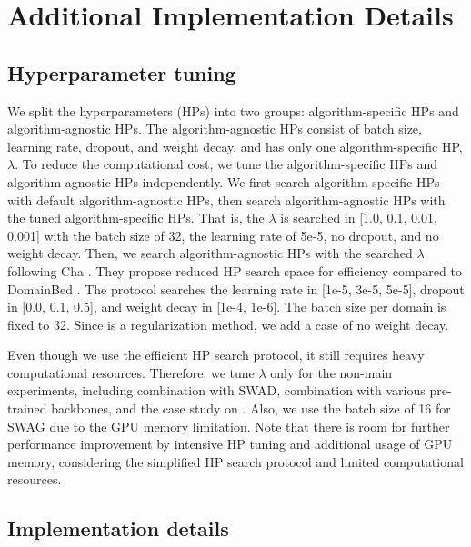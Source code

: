 \section{Additional Implementation Details}
\label{sec:additional_impl_details}

\subsection{Hyperparameter tuning}


We split the hyperparameters (HPs) into two groups: algorithm-specific HPs and algorithm-agnostic HPs. The algorithm-agnostic HPs consist of batch size, learning rate, dropout, and weight decay, and \method{} has only one algorithm-specific HP, $\lambda$.
To reduce the computational cost, we tune the algorithm-specific HPs and algorithm-agnostic HPs independently. 
We first search algorithm-specific HPs with default algorithm-agnostic HPs, then search algorithm-agnostic HPs with the tuned algorithm-specific HPs.
That is, the $\lambda$ is searched in [1.0, 0.1, 0.01, 0.001] with the batch size of 32, the learning rate of 5e-5, no dropout, and no weight decay. Then, we search algorithm-agnostic HPs with the searched $\lambda$ following Cha \etal \cite{cha2021swad}. They propose reduced HP search space for efficiency compared to DomainBed \cite{gulrajani2020domainbed}. The protocol searches the learning rate in [1e-5, 3e-5, 5e-5], dropout in [0.0, 0.1, 0.5], and weight decay in [1e-4, 1e-6]. The batch size per domain is fixed to 32. Since \method{} is a regularization method, we add a case of no weight decay.

Even though we use the efficient HP search protocol, it still requires heavy computational resources. Therefore, we tune $\lambda$ only for the non-main experiments, including combination with SWAD, combination with various pre-trained backbones, and the case study on . Also, we use the batch size of 16 for SWAG \cite{singh2022swag} due to the GPU memory limitation. Note that there is room for further performance improvement by intensive HP tuning and additional usage of GPU memory, considering the simplified HP search protocol and limited computational resources.

\subsection{Implementation details}

